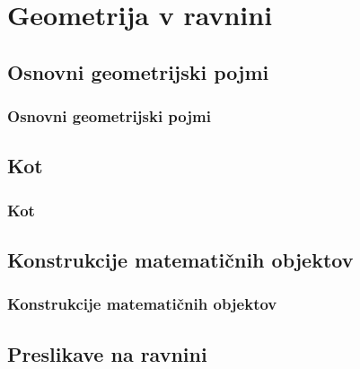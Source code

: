 \section{Geometrija v ravnini}

\begin{frame}
    \sectionpage
\end{frame}

\begin{frame}
\end{frame}

    \subsection{Osnovni geometrijski pojmi}

        \begin{frame}
            \frametitle{Osnovni geometrijski pojmi}
        \end{frame}

    \subsection{Kot}

        \begin{frame}
            \frametitle{Kot}
        \end{frame}

    \subsection{Konstrukcije matematičnih objektov}

        \begin{frame}
            \frametitle{Konstrukcije matematičnih objektov}
        \end{frame}

    \subsection{Preslikave na ravnini}

